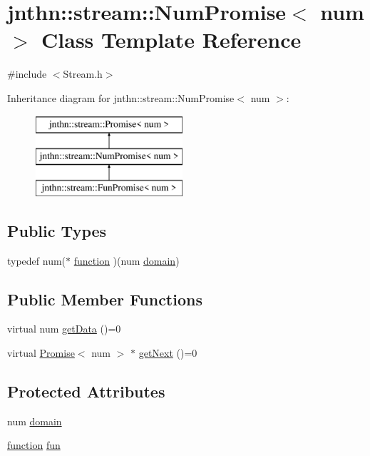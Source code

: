 \hypertarget{classjnthn_1_1stream_1_1NumPromise}{\section{jnthn\-:\-:stream\-:\-:Num\-Promise$<$ num $>$ Class Template Reference}
\label{classjnthn_1_1stream_1_1NumPromise}
}


{\ttfamily \#include $<$Stream.\-h$>$}

Inheritance diagram for jnthn\-:\-:stream\-:\-:Num\-Promise$<$ num $>$\-:\begin{figure}[H]
\begin{center}
\leavevmode
\includegraphics[height=3.000000cm]{classjnthn_1_1stream_1_1NumPromise}
\end{center}
\end{figure}
\subsection*{Public Types}
\begin{DoxyCompactItemize}
\item 
typedef num($\ast$ \hyperlink{classjnthn_1_1stream_1_1NumPromise_a362f41ffbe32df4763f4c35a56df295e}{function} )(num \hyperlink{classjnthn_1_1stream_1_1NumPromise_a7d01e34ebf5e403ac4bf04139505d321}{domain})
\end{DoxyCompactItemize}
\subsection*{Public Member Functions}
\begin{DoxyCompactItemize}
\item 
virtual num \hyperlink{classjnthn_1_1stream_1_1NumPromise_a64b32eb3dd18b2b5eee79ef80a156a69}{get\-Data} ()=0
\item 
virtual \hyperlink{classjnthn_1_1stream_1_1Promise}{Promise}$<$ num $>$ $\ast$ \hyperlink{classjnthn_1_1stream_1_1NumPromise_a3116d0c889cb2069c63d4e495de797e4}{get\-Next} ()=0
\end{DoxyCompactItemize}
\subsection*{Protected Attributes}
\begin{DoxyCompactItemize}
\item 
num \hyperlink{classjnthn_1_1stream_1_1NumPromise_a7d01e34ebf5e403ac4bf04139505d321}{domain}
\item 
\hyperlink{classjnthn_1_1stream_1_1NumPromise_a362f41ffbe32df4763f4c35a56df295e}{function} \hyperlink{classjnthn_1_1stream_1_1NumPromise_a71f5507f8e605259eadb00417dbc2906}{fun}
\end{DoxyCompactItemize}


